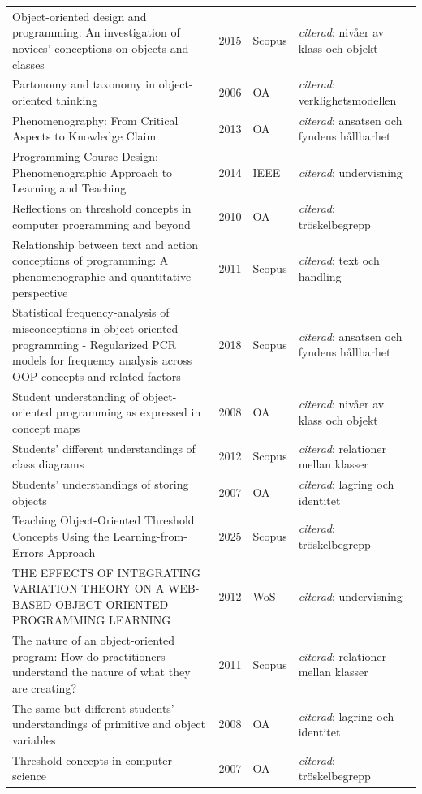\begin{longtable}{@{}%
  >{\raggedright\arraybackslash}p{}c%
  >{\raggedright\arraybackslash}p{}%
  >{\raggedright\arraybackslash}p{}@{}}
Object-oriented design and programming: An investigation of novices' conceptions on objects and classes & 2015 & Scopus & \emph{citerad}: nivåer av klass och objekt \\
Partonomy and taxonomy in object-oriented thinking & 2006 & OA & \emph{citerad}: verklighetsmodellen \\
Phenomenography: From Critical Aspects to Knowledge Claim & 2013 & OA & \emph{citerad}: ansatsen och fyndens hållbarhet \\
Programming Course Design: Phenomenographic Approach to Learning and Teaching & 2014 & IEEE & \emph{citerad}: undervisning \\
Reflections on threshold concepts in computer programming and beyond & 2010 & OA & \emph{citerad}: tröskelbegrepp \\
Relationship between text and action conceptions of programming: A phenomenographic and quantitative perspective & 2011 & Scopus & \emph{citerad}: text och handling \\
Statistical frequency-analysis of misconceptions in object-oriented-programming - Regularized PCR models for frequency analysis across OOP concepts and related factors & 2018 & Scopus & \emph{citerad}: ansatsen och fyndens hållbarhet \\
Student understanding of object-oriented programming as expressed in concept maps & 2008 & OA & \emph{citerad}: nivåer av klass och objekt \\
Students' different understandings of class diagrams & 2012 & Scopus & \emph{citerad}: relationer mellan klasser \\
Students' understandings of storing objects & 2007 & OA & \emph{citerad}: lagring och identitet \\
Teaching Object-Oriented Threshold Concepts Using the Learning-from-Errors Approach & 2025 & Scopus & \emph{citerad}: tröskelbegrepp \\
THE EFFECTS OF INTEGRATING VARIATION THEORY ON A WEB-BASED OBJECT-ORIENTED PROGRAMMING LEARNING & 2012 & WoS & \emph{citerad}: undervisning \\
The nature of an object-oriented program: How do practitioners understand the nature of what they are creating? & 2011 & Scopus & \emph{citerad}: relationer mellan klasser \\
The same but different students' understandings of primitive and object variables & 2008 & OA & \emph{citerad}: lagring och identitet \\
Threshold concepts in computer science & 2007 & OA & \emph{citerad}: tröskelbegrepp \\

\end{longtable}
